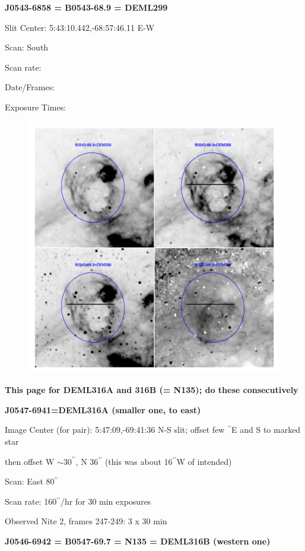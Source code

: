 \documentclass[11pt]{article}
\newcommand{\arcsec}{$^{\prime\prime}$}
\begin{document}
\newpage
{\bf J0543-6858 = B0543-68.9 = DEML299}  
 
Slit Center:  5:43:10.442,-68:57:46.11 E-W

Scan:  South

Scan rate:  

Date/Frames:

Exposure Times:  

\begin{figure}
\includegraphics[width=11.cm]{snapshots/B0543-689.png}
\end{figure}

\newpage 
{\bf This page for DEML316A and 316B (= N135); do these consecutively}

 
{\bf J0547-6941=DEML316A  (smaller one, to east)}

Image Center (for pair):  5:47:09,-69:41:36  N-S slit; offset few \arcsec E and S to marked star

then offset W $\sim 30^{\prime\prime}$, N 36$^{\prime\prime}$   (this was about 16\arcsec W of intended)

Scan:  East 80$^{\prime\prime}$

Scan rate:  160$^{\prime\prime}$/hr for 30 min exposures

Observed Nite 2, frames 247-249:   3 x 30 min

{\bf J0546-6942 = B0547-69.7 = N135 = DEML316B (western one)}
\end{document}
